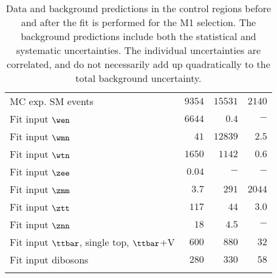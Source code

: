 \begin{table}[!ht]
\begin{center}
{\begin{tabular*}{\textwidth}{@{\extracolsep{\fill}}lrrr}
    \noalign{\smallskip}\hline\noalign{\smallskip}
    MC exp. SM events              & $9354$          & $15531$          & $2140$              \\
    \noalign{\smallskip}\hline\noalign{\smallskip}
    Fit input $\wen$          & $6644$          & $0.4$          & $-$              \\
    Fit input $\wmn$          & $41$          & $12839$          & $2.5$              \\
    Fit input $\wtn$          & $1650$          & $1142$          & $0.6$              \\
    Fit input $\zee$          & $0.04$          & $-$          & $-$              \\
    Fit input $\zmm$          & $3.7$          & $291$          & $2044$              \\
    Fit input $\ztt$          & $117$          & $44$          & $3.0$              \\
    Fit input $\znn$          & $18$          & $4.5$          & $-$              \\
    Fit input $\ttbar$, single top, $\ttbar$+V        & $600$          & $880$          & $32$              \\
    Fit input dibosons         & $280$          & $330$          & $58$              \\
    \noalign{\smallskip}\hline\noalign{\smallskip}
    \end{tabular*}
}
\end{center}
\caption{Data and background predictions in the control regions before and after the fit is performed for the M1 selection.
  The background predictions include both the statistical and systematic uncertainties.
    The individual uncertainties are correlated, and do not necessarily add up
    quadratically to the total background uncertainty.
}
\label{tab:ControlRegion_M1}
\end{table}
